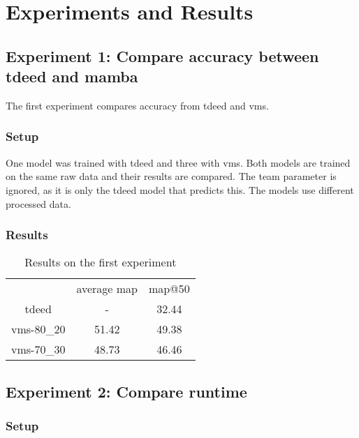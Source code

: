 \chapter{Experiments and Results}
\label{chap:experiments}

\section{Experiment 1: Compare accuracy between tdeed and mamba}

The first experiment compares accuracy from \acrshort{tdeed} and \acrshort{vms}. 

\subsection{Setup}
\label{ssec:ex1_setup}

One model was trained with \acrshort{tdeed} and three with \acrlong{vms}. Both models are trained on the same raw data and their results are compared. The team parameter is ignored, as it is only the \acrshort{tdeed} model that predicts this. The models use different processed data. 


\subsection{Results}


\begin{table}
    \centering
    \begin{tabular}{ccc}
         & average \acrshort{map} & \acrshort{map}@50\\
        \acrshort{tdeed} & - & 32.44 \\
        \acrshort{vms}-80\_20 & 51.42 & 49.38 \\
        \acrshort{vms}-70\_30 & 48.73 & 46.46 \\
    \end{tabular}
    \caption{Results on the first experiment}
    \label{tab:results_ex1}
\end{table}

\section{Experiment 2: Compare runtime}
\subsection{Setup}
\label{ssec:ex2_setup}


